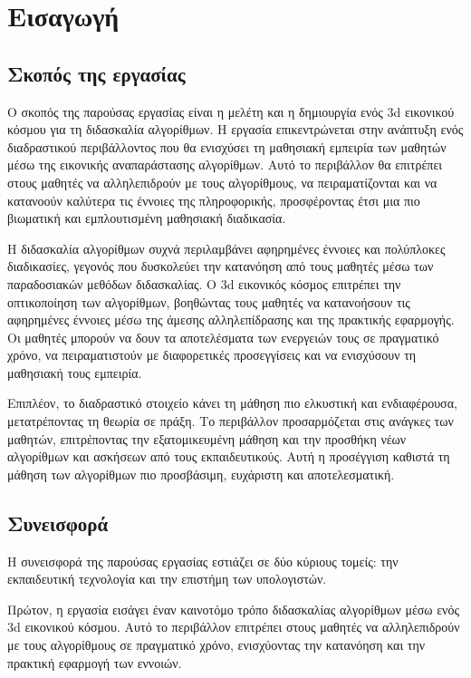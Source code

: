 \section{Εισαγωγή}

\subsection{Σκοπός της εργασίας}

Ο σκοπός της παρούσας εργασίας είναι η μελέτη και η δημιουργία ενός \acrshort{3d} εικονικού κόσμου για τη διδασκαλία αλγορίθμων. Η εργασία επικεντρώνεται στην ανάπτυξη ενός διαδραστικού περιβάλλοντος που θα ενισχύσει τη μαθησιακή εμπειρία των μαθητών μέσω της εικονικής αναπαράστασης αλγορίθμων. Αυτό το περιβάλλον θα επιτρέπει στους μαθητές να αλληλεπιδρούν με τους αλγορίθμους, να πειραματίζονται και να κατανοούν καλύτερα τις έννοιες της πληροφορικής, προσφέροντας έτσι μια πιο βιωματική και εμπλουτισμένη μαθησιακή διαδικασία.

Η διδασκαλία αλγορίθμων συχνά περιλαμβάνει αφηρημένες έννοιες και πολύπλοκες διαδικασίες, γεγονός που δυσκολεύει την κατανόηση από τους μαθητές μέσω των παραδοσιακών μεθόδων διδασκαλίας. Ο \acrshort{3d} εικονικός κόσμος επιτρέπει την οπτικοποίηση των αλγορίθμων, βοηθώντας τους μαθητές να κατανοήσουν τις αφηρημένες έννοιες μέσω της άμεσης αλληλεπίδρασης και της πρακτικής εφαρμογής. Οι μαθητές μπορούν να δουν τα αποτελέσματα των ενεργειών τους σε πραγματικό χρόνο, να πειραματιστούν με διαφορετικές προσεγγίσεις και να ενισχύσουν τη μαθησιακή τους εμπειρία.

Επιπλέον, το διαδραστικό στοιχείο κάνει τη μάθηση πιο ελκυστική και ενδιαφέρουσα, μετατρέποντας τη θεωρία σε πράξη. Το περιβάλλον προσαρμόζεται στις ανάγκες των μαθητών, επιτρέποντας την εξατομικευμένη μάθηση και την προσθήκη νέων αλγορίθμων και ασκήσεων από τους εκπαιδευτικούς. Αυτή η προσέγγιση καθιστά τη μάθηση των αλγορίθμων πιο προσβάσιμη, ευχάριστη και αποτελεσματική.


\subsection{Συνεισφορά}
Η συνεισφορά της παρούσας εργασίας εστιάζει σε δύο κύριους τομείς: την εκπαιδευτική τεχνολογία και την επιστήμη των υπολογιστών.

Πρώτον, η εργασία εισάγει έναν καινοτόμο τρόπο διδασκαλίας αλγορίθμων μέσω ενός \acrshort{3d} εικονικού κόσμου. Αυτό το περιβάλλον επιτρέπει στους μαθητές να αλληλεπιδρούν με τους αλγορίθμους σε πραγματικό χρόνο, ενισχύοντας την κατανόηση και την πρακτική εφαρμογή των εννοιών.

